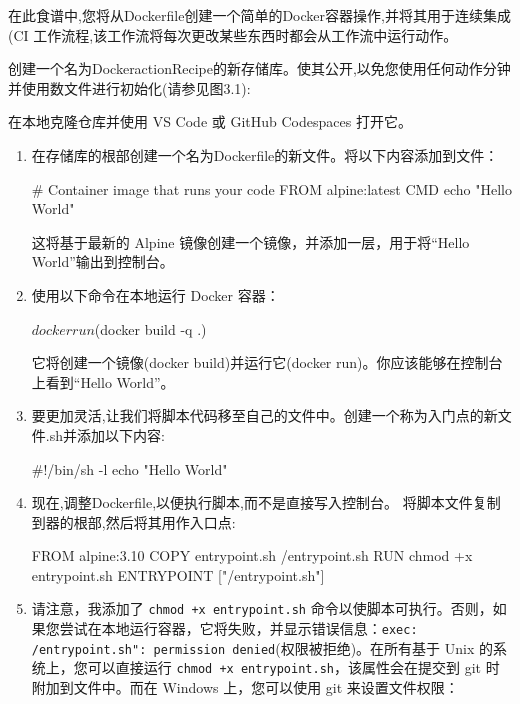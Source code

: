 
在此食谱中,您将从Dockerfile创建一个简单的Docker容器操作,并将其用于连续集成(CI 工作流程,该工作流将每次更改某些东西时都会从工作流中运行动作。


创建一个名为DockeractionRecipe的新存储库。使其公开,以免您使用任何动作分钟并使用数文件进行初始化(请参见图3.1):


在本地克隆仓库并使用 VS Code 或 GitHub Codespaces 打开它。


\begin{enumerate}
\item 
在存储库的根部创建一个名为Dockerfile的新文件。将以下内容添加到文件：

\begin{shell}
# Container image that runs your code
FROM alpine:latest
CMD echo "Hello World"
\end{shell}

这将基于最新的 Alpine 镜像创建一个镜像，并添加一层，用于将“Hello World”输出到控制台。

\item 
使用以下命令在本地运行 Docker 容器：

\begin{shell}
$ docker run $(docker build -q .)
\end{shell}

它将创建一个镜像(docker build)并运行它(docker run)。你应该能够在控制台上看到“Hello World”。

\item 
要更加灵活,让我们将脚本代码移至自己的文件中。创建一个称为入门点的新文件.sh并添加以下内容:

\begin{shell}
#!/bin/sh -l
echo "Hello World"
\end{shell}

\item 
现在,调整Dockerfile,以便执行脚本,而不是直接写入控制台。 将脚本文件复制到器的根部,然后将其用作入口点:

\begin{shell}
FROM alpine:3.10
COPY entrypoint.sh /entrypoint.sh
RUN chmod +x entrypoint.sh
ENTRYPOINT ["/entrypoint.sh"]
\end{shell}

\item 
请注意，我添加了 \verb|chmod +x entrypoint.sh| 命令以使脚本可执行。否则，如果您尝试在本地运行容器，它将失败，并显示错误信息：\verb|exec: /entrypoint.sh": permission denied|(权限被拒绝)。在所有基于 Unix 的系统上，您可以直接运行 \verb|chmod +x entrypoint.sh|，该属性会在提交到 git 时附加到文件中。而在 Windows 上，您可以使用 git 来设置文件权限：


\end{enumerate}
